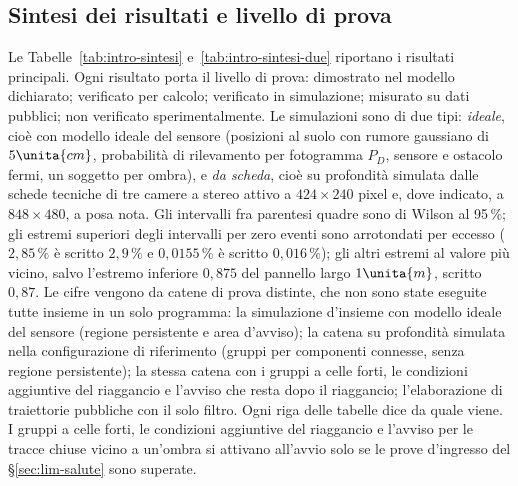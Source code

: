 \subsection{Sintesi dei risultati e livello di prova}\label{sec:intro-sintesi}

Le Tabelle~\ref{tab:intro-sintesi} e~\ref{tab:intro-sintesi-due} riportano i risultati principali. Ogni risultato porta il livello di prova:  dimostrato nel modello dichiarato;  verificato per calcolo;  verificato in simulazione;  misurato su dati pubblici;  non verificato sperimentalmente. Le simulazioni sono di due tipi: \emph{ideale}, cioè con modello ideale del sensore (posizioni al suolo con rumore gaussiano di $5\unita{cm}$, probabilità di rilevamento per fotogramma $P_D$, sensore e ostacolo fermi, un soggetto per ombra), e \emph{da scheda}, cioè su profondità simulata dalle schede tecniche di tre camere a stereo attivo a $424\times240$ pixel e, dove indicato, a $848\times480$, a posa nota. Gli intervalli fra parentesi quadre sono di Wilson al 95\,\%; gli estremi superiori degli intervalli per zero eventi sono arrotondati per eccesso ($2{,}85\,\%$ è scritto $2{,}9\,\%$ e $0{,}0155\,\%$ è scritto $0{,}016\,\%$); gli altri estremi al valore più vicino, salvo l'estremo inferiore $0{,}875$ del pannello largo $1\unita{m}$, scritto $0{,}87$. Le cifre vengono da catene di prova distinte, che non sono state eseguite tutte insieme in un solo programma: la simulazione d'insieme con modello ideale del sensore (regione persistente e area d'avviso); la catena su profondità simulata nella configurazione di riferimento (gruppi per componenti connesse, senza regione persistente); la stessa catena con i gruppi a celle forti, le condizioni aggiuntive del riaggancio e l'avviso che resta dopo il riaggancio; l'elaborazione di traiettorie pubbliche con il solo filtro. Ogni riga delle tabelle dice da quale viene. I gruppi a celle forti, le condizioni aggiuntive del riaggancio e l'avviso per le tracce chiuse vicino a un'ombra si attivano all'avvio solo se le prove d'ingresso del \S\ref{sec:lim-salute} sono superate.

